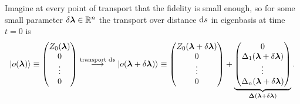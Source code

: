 


Imagine at every point of transport that the fidelity is small enough, so for some small parameter $\delta {\bm\lambda}\in \mathbb{R}^n$ the transport over distance $\mathrm{d} s$ in eigenbasis at time $t=0$ is
$$\ket{o({\bm\lambda})}\equiv \begin{pmatrix}
    Z_0({\bm\lambda})\\
    0\\
    \vdots \\
    0
\end{pmatrix} \overset{\text{transport }\mathrm{d} s}{\longrightarrow} \ket{o({\bm\lambda}+\delta {\bm\lambda})}\equiv\begin{pmatrix}
    Z_0({\bm\lambda}+\delta {\bm\lambda})\\
    0\\
    \vdots \\
    0
\end{pmatrix} +\underbrace{\begin{pmatrix}
    0\\
    \Delta_1({\bm\lambda}+\delta {\bm\lambda})\\
    \vdots \\
    \Delta_n({\bm\lambda}+\delta {\bm\lambda})
\end{pmatrix}}_{\mathbf{\Delta}({\bm\lambda}+\delta {\bm\lambda})}. $$

